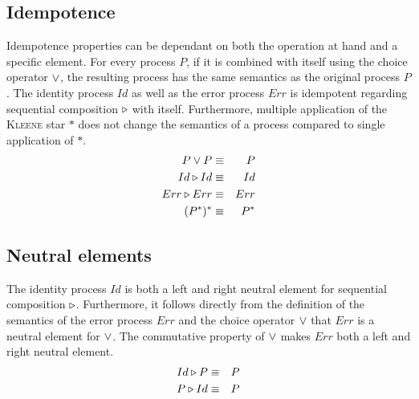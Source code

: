 \subsection{Idempotence}
Idempotence properties can be dependant on both the operation at hand and a specific element. For every process $P$, if it is combined with itself using the choice operator $\vee$, the resulting process has the same semantics as the original process $P$. The identity process $Id$ as well as the error process $Err$ is idempotent regarding sequential composition $\triangleright$ with itself. Furthermore, multiple application of the \textsc{Kleene} star $*$ does not change the semantics of a process compared to single application of $*$.
\begin{eqnarray*}
  P \vee P & \equiv & P \\
  Id \triangleright Id & \equiv & Id \\
  Err \triangleright Err & \equiv & Err \\
  (P^*)^* & \equiv & P^*
\end{eqnarray*}

\subsection{Neutral elements}
The identity process $Id$ is both a left and right neutral element for sequential composition $\triangleright$. Furthermore, it follows directly from the definition of the semantics of the error process $Err$ and the choice operator $\vee$ that $Err$ is a neutral element for $\vee$. The commutative property of $\vee$ makes $Err$ both a left and right neutral element.
\begin{eqnarray*}
  Id \triangleright P & \equiv & P \\
  P \triangleright Id & \equiv & P
\end{eqnarray*}